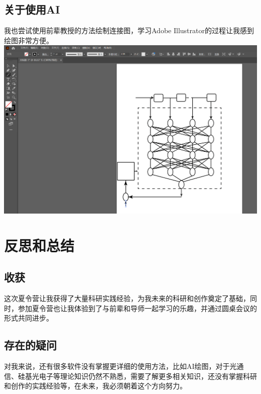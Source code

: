 \documentclass{article}
\begin{document}
\subsection{关于使用AI}
我也尝试使用前辈教授的方法绘制连接图，学习Adobe Illustrator的过程让我感到绘图非常方便。
\\
\noindent\includegraphics[width=\linewidth]{p6.png}
\section{反思和总结}
\subsection{收获}
这次夏令营让我获得了大量科研实践经验，为我未来的科研和创作奠定了基础，同时，参加夏令营也让我体验到了与前辈和导师一起学习的乐趣，并通过圆桌会议的形式共同进步。
\subsection{存在的疑问}
对我来说，还有很多软件没有掌握更详细的使用方法，比如AI绘图，对于光通信、硅基光电子等理论知识仍然不熟悉，需要了解更多相关知识，还没有掌握科研和创作的实践经验等，在未来，我必须朝着这个方向努力。
\end{document}
